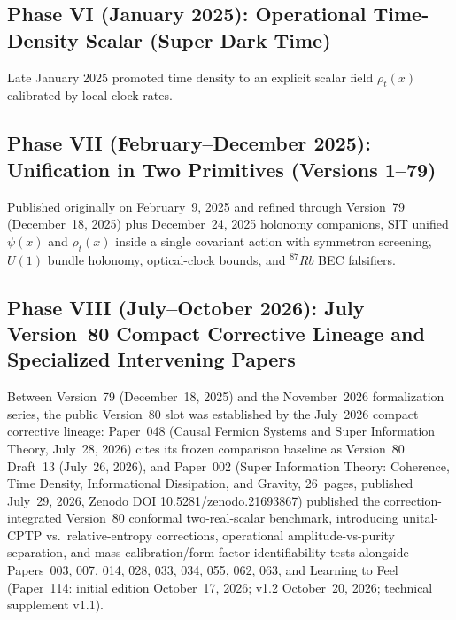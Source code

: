 \documentclass[american,11pt,letterpaper]{article}
\def\mathrm#1{#1}%
\def\texttt#1{#1}%
\def\emph#1{#1}%
\begin{document}
\subsection{Phase VI (January 2025): Operational Time-Density Scalar (\emph{Super Dark Time})}
Late January 2025 promoted time density to an explicit scalar field $\rho_t(x)$ calibrated by local clock rates.

\subsection{Phase VII (February--December 2025): Unification in Two Primitives (Versions 1--79)}
Published originally on February~9, 2025 and refined through Version~79 (December~18, 2025) plus December~24, 2025 holonomy companions, SIT unified $\psi(x)$ and $\rho_t(x)$ inside a single covariant action with symmetron screening, $U(1)$ bundle holonomy, optical-clock bounds, and $^{87}\mathrm{Rb}$ BEC falsifiers.

\subsection{Phase VIII (July--October 2026): July Version~80 Compact Corrective Lineage and Specialized Intervening Papers}
Between Version~79 (December~18, 2025) and the November~2026 formalization series, the public \emph{Version~80} slot was established by the July~2026 compact corrective lineage: Paper~048 (\emph{Causal Fermion Systems and Super Information Theory}, July~28, 2026) cites its frozen comparison baseline as \emph{Version~80 Draft~13} (July~26, 2026), and Paper~002 (\emph{Super Information Theory: Coherence, Time Density, Informational Dissipation, and Gravity}, 26~pages, published July~29, 2026, Zenodo DOI \texttt{10.5281/zenodo.21693867}) published the correction-integrated Version~80 conformal two-real-scalar benchmark, introducing unital-CPTP vs.\ relative-entropy corrections, operational amplitude-vs-purity separation, and mass-calibration/form-factor identifiability tests alongside Papers~003, 007, 014, 028, 033, 034, 055, 062, 063, and \emph{Learning to Feel} (Paper~114: initial edition October~17, 2026; v1.2 October~20, 2026; technical supplement v1.1).
\end{document}
